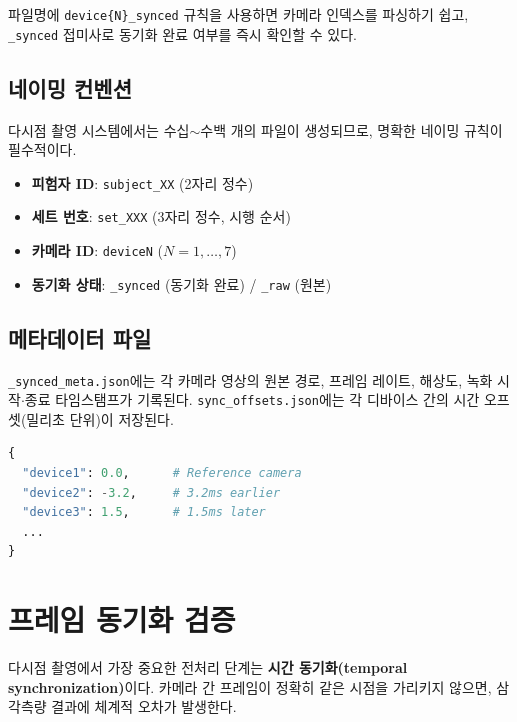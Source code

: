 \documentclass[11pt, a4paper]{report}
\begin{document}
\begin{keyidea}
파일명에 \texttt{device\{N\}\_synced} 규칙을 사용하면 카메라 인덱스를 파싱하기 쉽고,
\texttt{\_synced} 접미사로 동기화 완료 여부를 즉시 확인할 수 있다.
\end{keyidea}

\subsection{네이밍 컨벤션}

다시점 촬영 시스템에서는 수십$\sim$수백 개의 파일이 생성되므로,
명확한 네이밍 규칙이 필수적이다.

\begin{itemize}[nosep]
  \item \textbf{피험자 ID}: \texttt{subject\_XX} (2자리 정수)
  \item \textbf{세트 번호}: \texttt{set\_XXX} (3자리 정수, 시행 순서)
  \item \textbf{카메라 ID}: \texttt{deviceN} ($N = 1, \ldots, 7$)
  \item \textbf{동기화 상태}: \texttt{\_synced} (동기화 완료) / \texttt{\_raw} (원본)
\end{itemize}

\subsection{메타데이터 파일}

\texttt{\_synced\_meta.json}에는 각 카메라 영상의 원본 경로, 프레임 레이트, 해상도,
녹화 시작$\cdot$종료 타임스탬프가 기록된다. \texttt{sync\_offsets.json}에는 각 디바이스 간의
시간 오프셋(밀리초 단위)이 저장된다.

\begin{codebox}[title={sync\_offsets.json 예시}]
\begin{lstlisting}[language=Python, numbers=none]
{
  "device1": 0.0,      # Reference camera
  "device2": -3.2,     # 3.2ms earlier
  "device3": 1.5,      # 1.5ms later
  ...
}
\end{lstlisting}
\end{codebox}

\section{프레임 동기화 검증}

다시점 촬영에서 가장 중요한 전처리 단계는 \textbf{시간 동기화(temporal synchronization)}이다.
카메라 간 프레임이 정확히 같은 시점을 가리키지 않으면, 삼각측량 결과에 체계적 오차가 발생한다.
\end{document}
